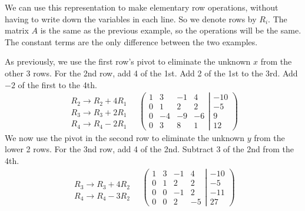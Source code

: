 We can use this representation to make elementary row operations, without having to write down the variables in each line. So we denote rows by $R_i$. The matrix $A$ is the same as the previous example, so the operations will be the same. The constant terms are the only difference between the two examples.

As previously, we use the first row’s pivot to eliminate the unknown $x$ from the other 3 rows. For the 2nd row, add 4 of the 1st. Add 2 of the 1st to the 3rd. Add $-2$ of the first to the 4th.
\begin{align*}
\begin{array}{l}
   \\
 R_2 \to R_2 + 4R_1 \\
 R_3 \to R_3 + 2R_1 \\
 R_4 \to R_4 - 2R_1
\end{array}
\quad
\left(
	\begin{matrix}
	   1 &   3 & -1 &   4 \\
	   0 &   1 &  2 &   2 \\
	   0 &  -4 & -9 &  -6 \\
	   0 &   3 &  8 &   1
	\end{matrix}
  \left|
	\begin{matrix}
	 -10 \\
	  -5 \\
	   9 \\
	  12
	\end{matrix}
  \right.
\right)
\end{align*}
We now use the pivot in the second row to eliminate the unknown $y$ from the lower 2 rows. For the 3nd row, add 4 of the 2nd. Subtract 3 of the 2nd from the 4th.
\begin{align*}
\begin{array}{l}
   \\
   \\
 R_3 \to R_3 + 4R_2 \\
 R_4 \to R_4 - 3R_2
\end{array}
\quad
\left(
	\begin{matrix}
	   1 &   3 & -1 &   4 \\
	   0 &   1 &  2 &   2 \\
	   0 &   0 & -1 &   2 \\
	   0 &   0 &  2 &  -5
	\end{matrix}
  \left|
	\begin{matrix}
	 -10 \\
	  -5 \\
	 -11 \\
	  27
	\end{matrix}
  \right.
\right)
\end{align*}
